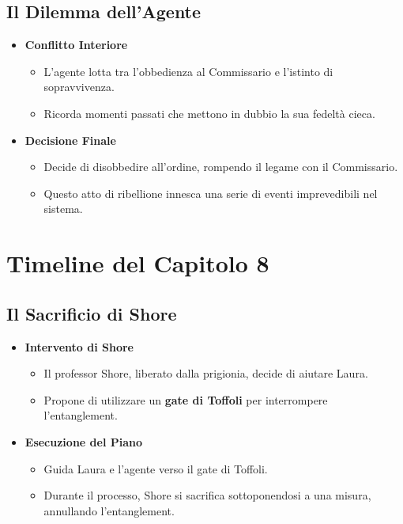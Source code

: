 \subsection*{Il Dilemma dell'Agente}

\begin{itemize}
    \item \textbf{Conflitto Interiore}
    \begin{itemize}
        \item L'agente lotta tra l'obbedienza al Commissario e l'istinto di sopravvivenza.
        \item Ricorda momenti passati che mettono in dubbio la sua fedeltà cieca.
    \end{itemize}

    \item \textbf{Decisione Finale}
    \begin{itemize}
        \item Decide di disobbedire all'ordine, rompendo il legame con il Commissario.
        \item Questo atto di ribellione innesca una serie di eventi imprevedibili nel sistema.
    \end{itemize}
\end{itemize}

\section*{Timeline del Capitolo 8}

\subsection*{Il Sacrificio di Shore}

\begin{itemize}
    \item \textbf{Intervento di Shore}
    \begin{itemize}
        \item Il professor Shore, liberato dalla prigionia, decide di aiutare Laura.
        \item Propone di utilizzare un \textbf{gate di Toffoli} per interrompere l'entanglement.
    \end{itemize}

    \item \textbf{Esecuzione del Piano}
    \begin{itemize}
        \item Guida Laura e l'agente verso il gate di Toffoli.
        \item Durante il processo, Shore si sacrifica sottoponendosi a una misura, annullando l'entanglement.
    \end{itemize}
\end{itemize}

